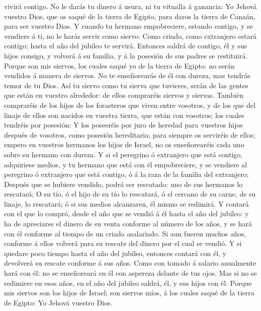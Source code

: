 vivirá contigo.  No le darás tu dinero á usura, ni tu
vitualla á ganancia:  Yo Jehová vuestro Dios, que os
saqué de la tierra de Egipto, para daros la tierra de Canaán, para ser
vuestro Dios.  Y cuando tu hermano empobreciere, estando
contigo, y se vendiere á ti, no le harás servir como siervo:
 Como criado, como extranjero estará contigo; hasta el
año del jubileo te servirá.  Entonces saldrá de contigo,
él y sus hijos consigo, y volverá á su familia, y á la posesión de sus
padres se restituirá.  Porque son mis siervos, los cuales
saqué yo de la tierra de Egipto: no serán vendidos á manera de siervos.
 No te enseñorearás de él con dureza, mas tendrás temor
de tu Dios.  Así tu siervo como tu sierva que tuvieres,
serán de las gentes que están en vuestro alrededor: de ellos compraréis
siervos y siervas.  También compraréis de los hijos de
los forasteros que viven entre vosotros, y de los que del linaje de
ellos son nacidos en vuestra tierra, que están con vosotros; los cuales
tendréis por posesión:  Y los poseeréis por juro de
heredad para vuestros hijos después de vosotros, como posesión
hereditaria; para siempre os serviréis de ellos; empero en vuestros
hermanos los hijos de Israel, no os enseñorearéis cada uno sobre su
hermano con dureza.  Y si el peregrino ó extranjero que
está contigo, adquiriese medios, y tu hermano que está con él
empobreciere, y se vendiere al peregrino ó extranjero que está contigo,
ó á la raza de la familia del extranjero;  Después que se
hubiere vendido, podrá ser rescatado: uno de sus hermanos lo rescatará;
 O su tío, ó el hijo de su tío lo rescatará, ó el cercano
de su carne, de su linaje, lo rescatará; ó si sus medios alcanzaren, él
mismo se redimirá.  Y contará con el que lo compró, desde
el año que se vendió á él hasta el año del jubileo: y ha de apreciarse
el dinero de su venta conforme al número de los años, y se hará con él
conforme al tiempo de un criado asalariado.  Si aun
fueren muchos años, conforme á ellos volverá para su rescate del dinero
por el cual se vendió.  Y si quedare poco tiempo hasta el
año del jubileo, entonces contará con él, y devolverá su rescate
conforme á sus años.  Como con tomado á salario
anualmente hará con él: no se enseñoreará en él con aspereza delante de
tus ojos.  Mas si no se redimiere en esos años, en el año
del jubileo saldrá, él, y sus hijos con él.  Porque mis
siervos son los hijos de Israel; son siervos míos, á los cuales saqué de
la tierra de Egipto: Yo Jehová vuestro Dios.

